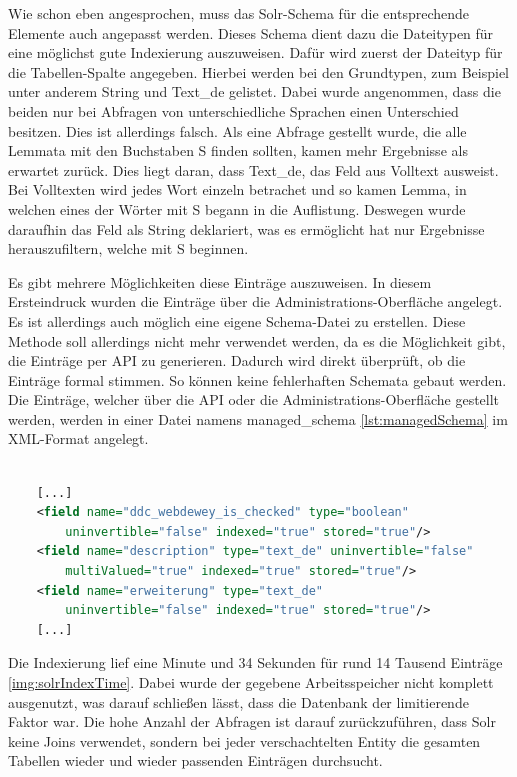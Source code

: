 Wie schon eben angesprochen, muss das Solr-Schema für die entsprechende Elemente auch angepasst werden. Dieses Schema dient dazu die Dateitypen für eine möglichst gute Indexierung auszuweisen. Dafür wird zuerst der Dateityp für die Tabellen-Spalte angegeben. Hierbei werden bei den Grundtypen, zum Beispiel unter anderem String und Text\_de gelistet. Dabei wurde angenommen, dass die beiden nur bei Abfragen von unterschiedliche Sprachen einen Unterschied besitzen. Dies ist allerdings falsch. Als eine Abfrage gestellt wurde, die alle Lemmata mit den Buchstaben S finden sollten, kamen mehr Ergebnisse als erwartet zurück. Dies liegt daran, dass Text\_de, das Feld aus Volltext ausweist. 
Bei Volltexten wird jedes Wort einzeln betrachet und so kamen Lemma, in welchen eines der Wörter mit S begann in die Auflistung. Deswegen wurde daraufhin das Feld als String deklariert, was es ermöglicht hat nur Ergebnisse herauszufiltern, welche mit S beginnen.

Es gibt mehrere Möglichkeiten diese Einträge auszuweisen. In diesem Ersteindruck wurden die Einträge über die Administrations-Oberfläche angelegt. Es ist allerdings auch möglich eine eigene Schema-Datei zu erstellen. Diese Methode soll allerdings nicht mehr verwendet werden, da es die Möglichkeit gibt, die Einträge per API zu generieren. Dadurch wird direkt überprüft, ob die Einträge formal stimmen. So können keine fehlerhaften Schemata gebaut werden. Die Einträge, welcher über die API oder die Administrations-Oberfläche gestellt werden, werden in einer Datei namens managed\_schema \ref{lst:managedSchema} im XML-Format angelegt.


\begin{lstlisting}[language=xml, frame=single, label={lst:managedSchema}, 
    morekeywords={type,uninvertible,indexed,stored,field,multiValued, name}] 

    [...]
    <field name="ddc_webdewey_is_checked" type="boolean" 
        uninvertible="false" indexed="true" stored="true"/>
    <field name="description" type="text_de" uninvertible="false" 
        multiValued="true" indexed="true" stored="true"/>
    <field name="erweiterung" type="text_de" 
        uninvertible="false" indexed="true" stored="true"/>
    [...]

\end{lstlisting}

Die Indexierung lief eine Minute und 34 Sekunden für rund 14 Tausend Einträge \ref{img:solrIndexTime}. Dabei wurde der gegebene Arbeitsspeicher nicht komplett ausgenutzt, was darauf schließen lässt, dass die Datenbank der limitierende Faktor war. Die hohe Anzahl der Abfragen ist darauf zurückzuführen, dass Solr keine Joins verwendet, sondern bei jeder verschachtelten Entity die gesamten Tabellen wieder und wieder passenden Einträgen durchsucht.

